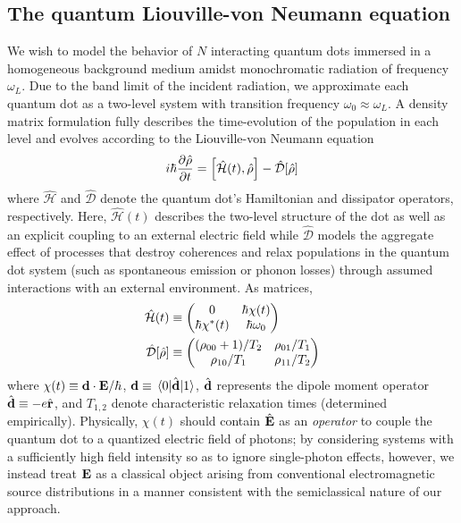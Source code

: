 \documentclass[conference]{IEEEtran}
\begin{document}
\subsection{The quantum Liouville-von Neumann equation}
We wish to model the behavior of $N$ interacting quantum dots immersed in a homogeneous background medium amidst monochromatic radiation of frequency $\omega_L$. Due to the band limit of the incident radiation, we approximate each quantum dot as a two-level system with transition frequency $\omega_0 \approx \omega_L$.
A density matrix formulation fully describes the time-evolution of the population in each level and evolves according to the Liouville-von Neumann equation
\begin{equation}
  i \hbar \pdv{\hat{\rho}}{t} = \commutator{\hat{\mathcal{H}}(t)}{\hat{\rho}} - \hat{\mathcal{D}}\qty[\hat{\rho}]
  \label{eq:liouville}
\end{equation}
where $\hat{\mathcal{H}}$ and $\hat{\mathcal{D}}$ denote the quantum dot's Hamiltonian and dissipator operators, respectively\cite{Breuer2002}.
Here, $\hat{\mathcal{H}}(t)$ describes the  two-level structure of the dot as well as an explicit coupling to an external electric field while $\hat{\mathcal{D}}$ models the aggregate effect of processes that destroy coherences and relax populations in the quantum dot system (such as spontaneous emission or phonon losses) through assumed interactions with an external environment.
As matrices,
\begin{subequations}
  \begin{align}
    \hat{\mathcal{H}}(t) &\equiv \mqty(0 & \hbar \chi(t) \\ \hbar \chi^*(t) & \hbar \omega_0) \label{eq:hamiltonian} \\
    \hat{\mathcal{D}}[\hat{\rho}] &\equiv \mqty((\rho_{00} + 1)/T_2 & \rho_{01}/T_1 \\ \rho_{10}/T_1 & \rho_{11}/T_2) \label{eq:dissipator}
  \end{align}
\end{subequations}
where $\chi(t) \equiv \vb{d} \cdot \vb{E}/\hbar$, $\vb{d} \equiv \matrixel{0}{\hat{\vb{d}}}{1}$, $\hat{\vb{d}}$ represents the dipole moment operator $\hat{\vb{d}} \equiv -e \hat{\vb{r}}$, and $T_{1,2}$ denote characteristic relaxation times (determined empirically).
Physically, $\chi(t)$ should contain $\hat{\vb{E}}$ as an \emph{operator} to couple the quantum dot to a quantized electric field of photons; by considering systems with a sufficiently high field intensity so as to ignore single-photon effects, however, we instead treat $\vb{E}$ as a classical object arising from conventional electromagnetic source distributions in a manner consistent with the semiclassical nature of our approach.
\end{document}
